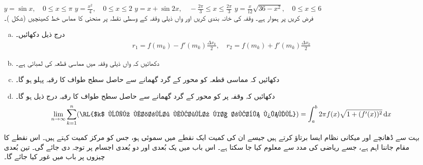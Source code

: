 $y=\sin x,\quad 0\le x\le \pi$
$y=\tfrac{x^2}{4},\quad 0\le x\le 2$
$y=x+\sin 2x,\quad -\tfrac{2\pi}{3}\le x\le \tfrac{2\pi}{3}$
$y=\tfrac{x}{12}\sqrt{36-x^2},\quad 0\le x\le 6$
\\
فرض کریں  پر  ہموار ہے۔ وقفہ  کی خانہ بندی کریں اور  واں ذیلی وقفہ  کے وسطی نقطہ  پر منحنی کا مماس خط  کھینچیں (شکل )۔
\begin{enumerate}[a.]
\item
درج ذیل دکھائیں۔
\begin{align*}
r_1=f(m_k)-f'(m_k)\frac{\Delta x_k}{2},\quad r_2=f(m_k)+f'(m_k)\frac{\Delta x_k}{2}
\end{align*}
\item
دکھائیں کہ  واں ذیلی وقفہ میں مماسی قطعہ کی لمبائی  ہے۔
\item
دکھائیں کہ مماسی قطعہ کو محور  کے گرد گھمانے سے حاصل سطح طواف کا رقبہ پہلو  ہو گا۔
\item
دکھائیں کہ وقفہ  پر  کو محور   کے  گرد گھمانے سے حاصل سطح طواف کا رقبہ درج ذیل ہو گا۔
\begin{align*}
\lim_{n\to \infty}\sum_{k=1}^n(\text{\RL{$k$ ویں مخروط مقطوع کا رقبہ پہلو}})=\int_a^b2\pi f(x)\sqrt{1+(f'(x))^2}\dif x
\end{align*}
\end{enumerate}





بہت سے ڈھانچے  اور میکانی نظام  ایسا  برتاؤ  کرتے ہیں جیسے ان کی کمیت ایک نقطے میں سموئی   ہو،   جس کو مرکز کمیت کہتے ہیں۔ اس نقطے کا مقام جاننا اہم ہے، جسے ریاضی کی مدد سے معلوم کیا جا سکتا ہے۔ اس باب میں یک بُعدی اور دو بُعدی اجسام  پر توجہ دی جائے گی۔ تین بُعدی چیزوں پر   باب  میں غور کیا جائے گا۔

